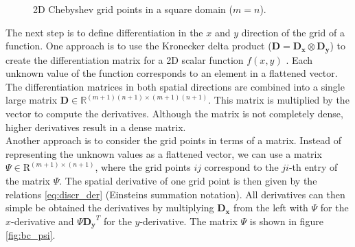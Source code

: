 \begin{figure}[ht]
  \centering
  \caption{2D Chebyshev grid points in a square domain ($m = n$).}
  \label{fig:cheb_grid2d}
\end{figure}

The next step is to define differentiation in the $x$ and $y$ direction of the
grid of a function. One approach is to use the Kronecker delta product
($\mathbf{D} = \mathbf{D_x} \otimes \mathbf{D_y}$) to create the differentiation
matrix for a 2D scalar function $f(x,y)$ \citep{trefethen2000}. Each unknown
value of the function corresponds to an element in a flattened vector. The
differentiation matrices in both spatial directions are combined into a single
large matrix $\mathbf{D} \in \mathbb{R}^{(m+1)(n+1)\times(m+1)(n+1)}$. This
matrix is multiplied by the vector to compute the derivatives. Although the
matrix is not completely dense, higher derivatives result in a dense matrix. \\

Another approach is to consider the grid points in terms of a matrix. Instead
of representing the unknown values as a flattened vector, we can use a matrix
$\Psi \in \mathrm{R}^{(m+1) \times (n+1)}$, where the grid points $ij$
correspond to the $ji$-th entry of the matrix $\Psi$. The spatial derivative of
one grid point is then given by the relations \eqref{eq:discr_der} (Einsteins
summation notation). All derivatives can then simple be obtained the
derivatives by multiplying $\mathbf{D_x}$ from the left with $\Psi$ for the
$x$-derivative and $\Psi \mathbf{D_y}^T$ for the $y$-derivative. The matrix
$\Psi$ is shown in figure \ref{fig:bc_psi}.

